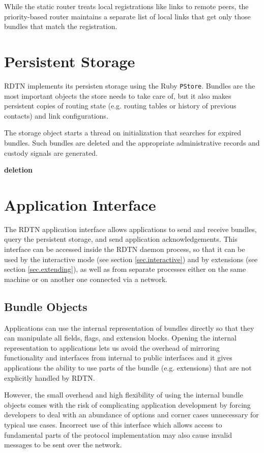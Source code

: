 \documentclass{article}
\begin{document}
While the static router treats local registrations like links to remote peers,
the priority-based router maintains a separate list of local links that get only
those bundles that match the registration.

\section{Persistent Storage}\label{sec.storage}

RDTN implements its persisten storage using the Ruby {\tt PStore}.
Bundles are the most important objects the store needs to take care of, but
it also makes persistent copies of routing state (e.g. routing
tables or history of previous contacts) and link configurations.

The storage object starts a thread on initialization that searches
for expired bundles. Such bundles are deleted and the appropriate administrative
records and custody signals are generated.

{\bf deletion}

\section{Application Interface}\label{sec.appif}

The RDTN application interface allows applications to send and receive bundles,
query the persistent storage, and send application acknowledgements. This
interface can be accessed inside the RDTN daemon process, so that it can be used
by the interactive mode (see section \ref{sec.interactive}) and by extensions
(see section \ref{sec.extending}), as well as from separate processes either on
the same machine or on another one connected via a network.

\subsection{Bundle Objects}\label{sec.bundle-obj}

Applications can use the internal representation of bundles directly so that
they can manipulate all fields, flags, and extension blocks. Opening the
internal representation to applications lets us avoid the overhead of mirroring
functionality and interfaces from internal to public interfaces and it gives
applications the ability to use parts of the bundle (e.g. extensions) that are
not explicitly handled by RDTN.

However, the small overhead and high flexibility of using the internal bundle
objects comes with the risk of complicating application development by forcing
developers to deal with an abundance of options and corner cases unnecessary for
typical use cases. Incorrect use of this interface which allows access to
fundamental parts of the protocol implementation may also cause invalid messages
to be sent over the network.
\end{document}
